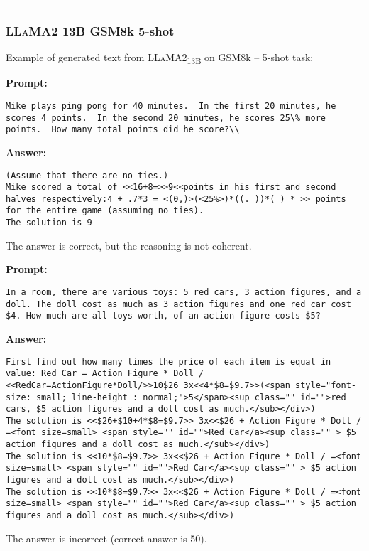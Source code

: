 	\noindent\rule{\textwidth}{0.4pt}

	\subsubsection*{\textsc{LLaMA}2 13B GSM8k 5-shot}
	\noindent Example of generated text from \textsc{LLaMA}2\textsubscript{13B} on GSM8k -- 5-shot task:
	\begin{displayquote}
		\textbf{Prompt:}
		\begin{Verbatim}[fontsize=\small,breaklines]
Mike plays ping pong for 40 minutes.  In the first 20 minutes, he scores 4 points.  In the second 20 minutes, he scores 25\% more points.  How many total points did he score?\\
	\end{Verbatim}
		\textbf{Answer:}
		\begin{Verbatim}[fontsize=\small,breaklines]
(Assume that there are no ties.)
Mike scored a total of <<16+8=>>9<<points in his first and second halves respectively:4 + .7*3 = <(0,)>(<25%>)*((. ))*( ) * >> points for the entire game (assuming no ties).
The solution is 9
	\end{Verbatim}
	\end{displayquote}
	The answer is correct, but the reasoning is not coherent.
	\begin{displayquote}
		\textbf{Prompt:}
		\begin{Verbatim}[fontsize=\small,breaklines]
In a room, there are various toys: 5 red cars, 3 action figures, and a doll. The doll cost as much as 3 action figures and one red car cost $4. How much are all toys worth, of an action figure costs $5?
	\end{Verbatim}

		\textbf{Answer:}
		\begin{Verbatim}[fontsize=\small,breaklines]
First find out how many times the price of each item is equal in value: Red Car = Action Figure * Doll / <<RedCar=ActionFigure*Doll/>>10$26 3x<<4*$8=$9.7>>(<span style="font-size: small; line-height : normal;">5</span><sup class="" id="">red cars, $5 action figures and a doll cost as much.</sub></div>)
The solution is <<$26+$10+4*$8=$9.7>> 3x<<$26 + Action Figure * Doll / =<font size=small> <span style="" id="">Red Car</a><sup class="" > $5 action figures and a doll cost as much.</sub></div>)
The solution is <<10*$8=$9.7>> 3x<<$26 + Action Figure * Doll / =<font size=small> <span style="" id="">Red Car</a><sup class="" > $5 action figures and a doll cost as much.</sub></div>)
The solution is <<10*$8=$9.7>> 3x<<$26 + Action Figure * Doll / =<font size=small> <span style="" id="">Red Car</a><sup class="" > $5 action figures and a doll cost as much.</sub></div>)
	\end{Verbatim}
	\end{displayquote}
	The answer is incorrect (correct answer is 50).

